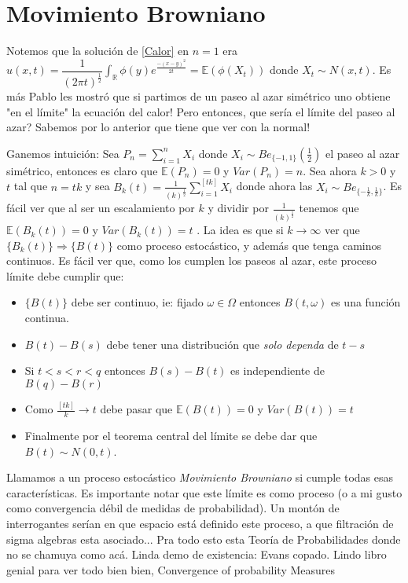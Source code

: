 \documentclass[11pt]{article}
\newcommand{\R}{{\mathbb{R}}}
\begin{document}
\section{Movimiento Browniano}

Notemos que la soluci\'on de \ref{Calor} en $n=1$ era $u(x,t)=\dfrac{1}{(2\pi t)^{\frac{1}{2}}}\int_{\R}{\phi(y)e^{\frac{-(x-y)^2}{2t}}} = \mathbb{E}(\phi(X_t))$ donde $X_t \sim N(x,t)$. Es m\'as Pablo les mostr\'o que si partimos de un paseo al azar sim\'etrico uno obtiene "en el l\'imite" la ecuaci\'on del calor! Pero entonces, que ser\'ia el l\'imite del paseo al azar? Sabemos por lo anterior que tiene que ver con la normal!

Ganemos intuici\'on: Sea $P_n = \sum_{i=1}^{n}{X_i}$ donde $X_i \sim Be_{\{-1,1\}}(\frac{1}{2})$ el paseo al azar sim\'etrico, entonces es claro que $\mathbb{E}(P_n)=0$ y $Var(P_n)=n$. Sea ahora $k > 0$ y $t$ tal que $n=tk$ y sea $B_{k}(t) = \frac{1}{(k)^{\frac{1}{2}}} \sum_{i=1}^{[tk]}{X_i}$ donde ahora las $X_i \sim Be_{\{-\frac{1}{k},\frac{1}{k}\}}$. Es f\'acil ver que al ser un escalamiento por $k$ y dividir por $\frac{1}{(k)^{\frac{1}{2}}}$ tenemos que $\mathbb{E}(B_k(t))=0$ y $Var(B_k(t))=t$ . La idea es que si $k \rightarrow \infty$ ver que $\{B_k(t)\} \Rightarrow \{B(t)\}$ como proceso estoc\'astico, y adem\'as que tenga caminos continuos. Es f\'acil ver que, como los cumplen los paseos al azar, este proceso l\'imite debe cumplir que:

\begin{itemize}

\item $\{B(t)\}$ debe ser continuo, ie: fijado $\omega \in \Omega$ entonces $B(t,\omega)$ es una funci\'on continua.
\item $B(t)-B(s)$ debe tener una distribuci\'on que \textit{solo dependa} de $t-s$
\item Si $t<s<r<q$ entonces $B(s)-B(t)$ es independiente de $B(q)-B(r)$
\item Como $\frac{[tk]}{k} \rightarrow t$ debe pasar que $\mathbb{E}(B(t))=0$ y $Var(B(t))=t$
\item Finalmente por el teorema central del l\'imite se debe dar que $B(t) \sim N(0,t)$.

\end{itemize}

Llamamos a un proceso estoc\'astico \textit{Movimiento Browniano} si cumple todas esas caracter\'isticas. Es importante notar que este l\'imite es como proceso (o a mi gusto como convergencia d\'ebil de medidas de probabilidad). Un mont\'on de interrogantes ser\'ian en que espacio est\'a definido este proceso, a que filtraci\'on de sigma algebras esta asociado... Pra todo esto esta Teor\'ia de Probabilidades donde no se chamuya como ac\'a. Linda demo de existencia: Evans copado. Lindo libro genial para ver todo bien bien, Convergence of probability Measures
\end{document}
